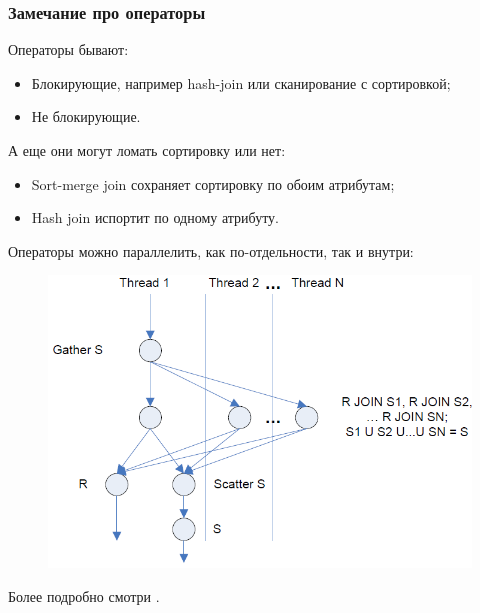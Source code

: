 \documentclass{beamer}
\begin{document}
\begin{frame}
\frametitle{Замечание про операторы}
\footnotesize
Операторы бывают:
\begin{itemize}  
  \item Блокирующие, например hash-join или сканирование с сортировкой;
  \item Не блокирующие.
\end{itemize}

А еще они могут ломать сортировку или нет:
\begin{itemize}  
  \item Sort-merge join сохраняет сортировку по обоим атрибутам;
  \item Hash join испортит по одному атрибуту.
\end{itemize}


Операторы можно параллелить, как по-отдельности, так и внутри:

\begin{figure}[htb]
\includegraphics[width=\textwidth,height=0.30\textheight,keepaspectratio]{parallel.png} 
\end{figure}

Более подробно смотри \cite{Taniar2008}.

\end{frame}
\end{document}
